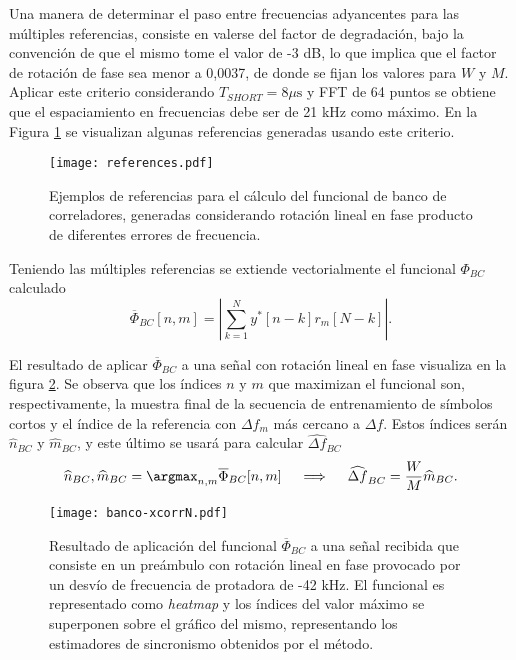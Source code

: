 Una manera de determinar el paso entre frecuencias adyancentes para las múltiples referencias, consiste en valerse del factor de degradación, bajo la convención de que el mismo tome el valor de -3 dB, lo que implica que el factor de rotación de fase sea menor a 0,0037, de donde se fijan los valores para $W$ y $M$. Aplicar este criterio considerando $T_{SHORT} = 8 \mu\text{s}$ y FFT de 64 puntos se obtiene que el espaciamiento en frecuencias debe ser de 21 kHz como máximo. En la Figura \ref{fig:references} se visualizan algunas referencias generadas usando este criterio.
\begin{figure}[t]
    \centering{}\texttt{[image: references.pdf]}
    \caption[Ejemplos de referencias para el \color{RoyalBlue} funcional \color{black} de banco de correladores.]{Ejemplos de referencias para el cálculo del \color{RoyalBlue} funcional \color{black} de banco de correladores, generadas considerando rotación lineal en fase producto de diferentes errores de frecuencia.\label{fig:references}}  
\end{figure}


Teniendo las múltiples referencias se extiende vectorialmente el \color{RoyalBlue} funcional \color{black} $\Phi_{BC}$ calculado
\begin{equation}\label{eq:correladores-banco}
    \overline{\Phi}_{BC}[n,m] = \left\lvert \sum_{k=1}^{N}y^\ast[n-k]r_m[N-k] \right\rvert.
\end{equation}

El resultado de aplicar $\overline{\Phi}_{BC}$ a una señal con rotación lineal en fase visualiza en la figura \ref{fig:banco-xcorrN}. Se observa que los índices $n$ y $m$ que maximizan el \color{RoyalBlue} funcional \color{black} son, respectivamente, la muestra final de la secuencia de entrenamiento de símbolos cortos y el índice de la referencia con $\Delta f_m$ más cercano a $\Delta f$. Estos índices serán $\widehat{n}_{BC}$ y $\widehat{m}_{BC}$, y este último se usará para calcular $\widehat{\Delta f}_{BC}$
\begin{equation}
    \widehat{n}_{BC}, \widehat{m}_{BC} = \argmax_{n,m}\overline{\Phi}_{BC}[n,m] \quad \implies \quad     \widehat{\Delta f}_{BC} = \frac{W}{M} \widehat{m}_{BC}.
\end{equation}

\begin{figure}[t]
    \centering{}\texttt{[image: banco-xcorrN.pdf]}
    \caption[Aplicación del \color{RoyalBlue} funcional \color{black} $\overline{\Phi}_{BC}$ a una señal recibida con error en frecuencia.]{Resultado de aplicación del \color{RoyalBlue} funcional \color{black} $\overline{\Phi}_{BC}$ a una señal recibida que consiste en un preámbulo con rotación lineal en fase provocado por un desvío de frecuencia de protadora de -42 kHz. \color{Green} El funcional es representado como \textit{heatmap} y los índices del valor máximo se superponen sobre el gráfico del mismo, representando los estimadores de sincronismo obtenidos por el método. \color{black}\label{fig:banco-xcorrN}}  
\end{figure}


